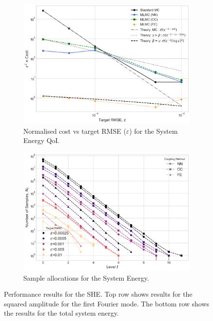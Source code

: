 \begin{figure}[htbp]
\begin{subfigure}{0.45\textwidth}
        \centering
        \includegraphics[width=\linewidth]{graphics/she_costs_energy.png}
        \caption{Normalised cost vs target RMSE ($\varepsilon$) for the System Energy QoI.}
        \label{fig:energy_performance}
    \end{subfigure}
    \hfill
    \begin{subfigure}{0.45\textwidth}
        \centering
        \includegraphics[width=\linewidth]{graphics/she_energy_nums.png}
        \caption{Sample allocations for the System Energy.}
        \label{fig:energy_levels_num}
    \end{subfigure}
    \caption{Performance results for the SHE. Top row shows results for the squared 
    amplitude for the first Fourier mode. The bottom row shows the results for the
    total system energy.}
    \label{fig:performance_results_she}
\end{figure}


